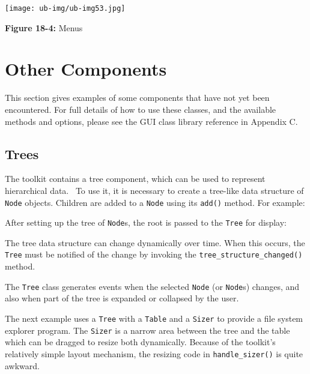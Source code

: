 \begin{center}
\texttt{[image: ub-img/ub-img53.jpg]}
\end{center}

{\sffamily\bfseries Figure 18-4:}
{\sffamily Menus}

\section{Other Components}

This section gives examples of some components that have not yet been
encountered. For full details of how to use these classes, and the
available methods and options, please see the GUI class library
reference in Appendix C.

\subsection{Trees}

The toolkit contains a tree component, which can be used to represent
hierarchical data. \ To use it, it is necessary to create a tree-like
data structure of \texttt{Node} objects. Children are added to a
\texttt{Node} using its \texttt{add()} method. For example:


After setting up the tree of \texttt{Node}s, the root is passed
to the \texttt{Tree} for display:


\noindent The tree data structure can change dynamically over time. When this
occurs, the \texttt{Tree} must be notified of the change by invoking
the \texttt{tree\_structure\_changed()} method.

The \texttt{Tree} class generates events when the selected \texttt{Node}
(or \texttt{Node}s) changes, and also when part of the tree is expanded
or collapsed by the user.

The next example uses a \texttt{Tree} with a \texttt{Table} and a
\texttt{Sizer} to provide a file system explorer program.
The \texttt{Sizer} is a narrow area between
the tree and the table which can be dragged to resize both dynamically.
Because of the toolkit's relatively simple layout
mechanism, the resizing code in \texttt{handle\_sizer()} is quite
awkward.



